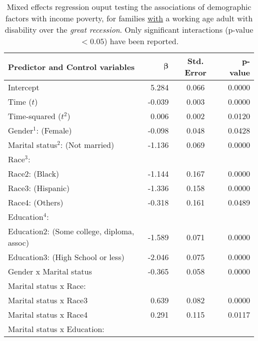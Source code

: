 \begin{table}[H]
\centering
\caption{Mixed effects regression ouput testing the associations of demographic factors with income poverty, for families {\underline{with}} a working age adult with disability over the {\emph{great recession}}. Only significant interactions (p-value $< 0.05$) have been reported.} 
\begin{threeparttable}
\begin{tabular}{lrcr}
  \hline
  {\bf{Predictor and Control variables}} & $\mathbf{\beta}$ & {\bf{Std. Error}} & {\bf{p-value}} \\ 
  \hline
  Intercept 						& 5.284		& 0.066 & 0.0000 \\ 
  Time ($t$) 						& -0.039 	& 0.003 & 0.0000 \\ 
  Time-squared ($t^2$) 					& 0.006		& 0.002 & 0.0120 \\ 
  Gender$^1$: (Female) 					& -0.098 	& 0.048 & 0.0428 \\ 
  Marital status$^2$: (Not married) 			& -1.136 	& 0.069 & 0.0000 \\ 
Race$^3$: & & & \\
  \hspace{5pt} Race2: (Black) 				& -1.144 	& 0.167 & 0.0000 \\ 
  \hspace{5pt}   Race3: (Hispanic) 			& -1.336 	& 0.158 & 0.0000 \\ 
  \hspace{5pt}   Race4: (Others) 			& -0.318 	& 0.161 & 0.0489 \\ 
Education$^4$: & & & \\
  \hspace{5pt}   Education2: (Some college, diploma, assoc) & -1.589 	& 0.071 & 0.0000 \\ 
  \hspace{5pt}   Education3: (High School or less) 	& -2.046 	& 0.075 & 0.0000 \\ 
  Gender x Marital status 				& -0.365 	& 0.058 & 0.0000 \\ 
Marital status x Race: & & & \\
  \hspace{5pt}   Marital status x Race3 		& 0.639		& 0.082 & 0.0000 \\ 
  \hspace{5pt}   Marital status x Race4 		& 0.291		& 0.115 & 0.0117 \\ 
Marital status x Education: & & & \\

\end{tabular}
\end{threeparttable}
\end{table}
